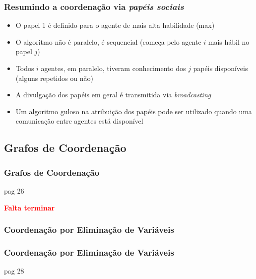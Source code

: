 \begin{frame}[allowframebreaks=0.9]
\frametitle{Resumindo a coordenação via \textit{papéis sociais}}

\begin{itemize}
  \item O papel 1 é definido para o agente de mais alta habilidade (max)

  \item O algoritmo não é paralelo, é sequencial (começa pelo  agente $i$
  mais hábil no papel $j$)

  \item Todos $i$ agentes, em paralelo, tiveram conhecimento dos $j$ papéis disponíveis (alguns repetidos ou não)

  \item A divulgação dos papéis em geral é transmitida via
\textit{broadcasting}

 \item Um algoritmo guloso na atribuição dos papéis pode ser utilizado 
quando uma comunicação entre agentes está disponível
  
\end{itemize}


\end{frame}

\subsection{Grafos de Coordenação}

\begin{frame}
\frametitle{Grafos de Coordenação}

pag 26


\begin{huge}

\textbf{ \textcolor{red}{Falta terminar}}
 

\end{huge}
\end{frame}


\subsubsection{Coordenação por Eliminação de Variáveis}

\begin{frame}
\frametitle{Coordenação por Eliminação de Variáveis}

pag 28


\end{frame}


